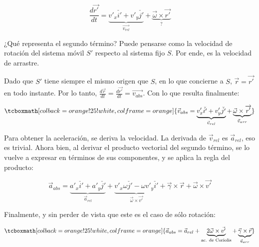 \documentclass{article}
\begin{document}
\begin{equation}
\frac{d\overrightarrow{r'}}{dt} = \underbrace{ v'_x \check{i'} + v'_y \check{j'} }_{\overrightarrow{v_{rel}}} + \underbrace{ \overrightarrow{\omega} \times \overrightarrow{r'} }_{?}
\end{equation}

¿Qué representa el segundo término? Puede pensarse como la velocidad de rotación del sistema móvil $S'$ respecto al sistema fijo $S$. Por ende, es la velocidad de arrastre.

Dado que $S'$ tiene siempre el mismo origen que $S$, en lo que concierne a $S$, $\overrightarrow{r} = \overrightarrow{r'}$ en todo instante. Por lo tanto, $\frac{d\overrightarrow{r}}{dt} = \frac{d\overrightarrow{r'}}{dt} = \overrightarrow{v_{abs}}$. Con lo que resulta finalmente:

\begin{equation}
\tcboxmath[colback=orange!25!white,colframe=orange]{
\vec{v}_{abs} = \underbrace{ v'_x \check{i'} + v'_y \check{j'} }_{\vec{v}_{rel}} + \underbrace{ \vec{\omega} \times \overrightarrow{r'} }_{\vec{v}_{arr}}
}
\end{equation}

Para obtener la aceleración, se deriva la velocidad. La derivada de $\vec{v}_{rel}$ es $\vec{a}_{rel}$, eso es trivial. Ahora bien, al derivar el producto vectorial del segundo término, se lo vuelve a expresar en términos de sus componentes, y se aplica la regla del producto:

\begin{equation}
\vec{a}_{abs} = \underbrace{ a'_x \check{i'} + a'_y \check{j'} }_{\vec{a}_{rel}} + \underbrace{ v'_x \omega \check{j'} - \omega v'_y \check{i'} }_{\vec{\omega} \times \vec{v'}} + \vec{\gamma} \times \vec{r} + \vec{\omega} \times \vec{v'}
\end{equation}

Finalmente, y sin perder de vista que este es el caso de sólo rotación:

\begin{equation}
\tcboxmath[colback=orange!25!white,colframe=orange]{
\vec{a}_{abs} = \vec{a}_{rel} + \underbrace{2 \vec{\omega} \times \vec{v'} }_{\text{ac. de Coriolis}} + \underbrace{ \vec{\gamma} \times \vec{r} }_{\vec{a}_{arr}}
}
\end{equation}
\end{document}

